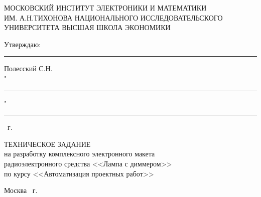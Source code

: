\begin{titlepage}
	\begin{center}
		МОСКОВСКИЙ ИНСТИТУТ ЭЛЕКТРОНИКИ И МАТЕМАТИКИ\\
		ИМ. А.Н.ТИХОНОВА НАЦИОНАЛЬНОГО ИССЛЕДОВАТЕЛЬСКОГО\\
		УНИВЕРСИТЕТА ВЫСШАЯ ШКОЛА ЭКОНОМИКИ
	\end{center}
	
	
	\vspace{8ex}
	
	\begin{flushright}
		Утверждаю:\\
		\rule{2.5cm}{0.4pt} Полесский С.Н.\\
		"\rule{1.2cm}{0.4pt}"\rule{2.9cm}{0.4pt} \the\year \, г.
		
		
	\end{flushright}	
	
	\vspace{5ex}
	
	\begin{center}
		ТЕХНИЧЕСКОЕ ЗАДАНИЕ\\
		на разработку комплексного электронного макета\\
		радиоэлектронного средства <<Лампа с диммером>>\\
		по курсу <<Автоматизация проектных работ>>

	\end{center}	

	\vspace{2ex}
	\vfill
	
	\vspace{2ex}
	
	

	\vspace{5ex}
	\begin{center}
		Москва \the\year \, г.
	\end{center}
	
\end{titlepage}
\addtocounter{page}{1}